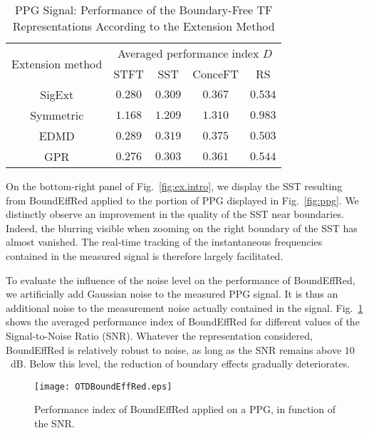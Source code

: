 \begin{table}
\centering
\caption{PPG Signal: Performance of the Boundary-Free TF Representations According to the Extension Method}
\begin{tabular}{|c||c|c|c|c|}
  \hline
   \multirow{2}{40pt}{\centering Extension method} & \multicolumn{4}{c|}{Averaged performance index $D$} \\
   \cline{2-5}
      & STFT & SST & ConceFT & RS\\
   \hhline{|=#=|=|=|=|}
   {\sf SigExt} & $0.280$ & $0.309$ & $0.367$ & $0.534$ \\
   \hline
   Symmetric & $1.168$ & $1.209$ & $1.310$ & $0.983$ \\
   \hline
   EDMD & $0.289$ & $0.319$ & $0.375$ & $0.503$ \\
   \hline
   GPR & $0.276$ & $0.303$ & $0.361$ & $0.544$ \\
   \hline
\end{tabular}
\label{tab:otd.ppg}
\end{table}

On the bottom-right panel of Fig.~\ref{fig:ex.intro}, we display the SST resulting from {\sf BoundEffRed} applied to the portion of PPG displayed in Fig.~\ref{fig:ppg}. We distinctly observe an improvement in the quality of the SST near boundaries. Indeed, the blurring visible when zooming on the right boundary of the SST has almost vanished. The real-time tracking of the instantaneous frequencies contained in the measured signal is therefore largely facilitated.



To evaluate the influence of the noise level on the performance of {\sf BoundEffRed}, we artificially add Gaussian noise to the measured PPG signal. It is thus an additional noise to the measurement noise actually contained in the signal. Fig.~\ref{fig:otd.noise} shows the averaged performance index of {\sf BoundEffRed} for different values of the Signal-to-Noise Ratio (SNR). Whatever the representation considered, {\sf BoundEffRed} is relatively robust to noise, as long as the SNR remains above $10$~dB. Below this level, the reduction of boundary effects gradually deteriorates.


\begin{figure}
\centering
\texttt{[image: OTDBoundEffRed.eps]}
\caption{Performance index of {\sf BoundEffRed} applied on a PPG, in function of the SNR.}
\label{fig:otd.noise}
\end{figure} 